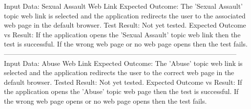 \documentclass[letterpaper,12pt,titlepage]{article}
\begin{document}
Input Data: Sexual Assault Web Link
\newline
\newline
Expected Outcome: The 'Sexual Assault' topic web link is selected and the application redirects the user to the associated web page in the default browser.
\newline
\newline
Test Result: Not yet tested.
\newline
\newline
Expected Outcome vs Result: If the application opens the 'Sexual Assault' topic web link then the test is successful. If the wrong web page or no web page opens then the test fails.
\newline
\newline
------------------------------------------------------------------------------------------------------
\newline
Input Data: Abuse Web Link
\newline
\newline
Expected Outcome: The 'Abuse' topic web link is selected and the application redirects the user to the correct web page in the default browser.
\newline
\newline
Tested Result: Not yet tested.
\newline
\newline
Expected Outcome vs Result: If the application opens the 'Abuse' topic web page then the test is successful. If the wrong web page opens or no web page opens then the test fails.

\newpage
\end{document}
